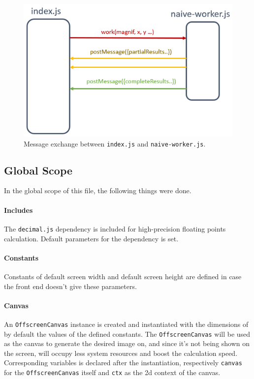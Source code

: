 \begin{figure}[th]
\centering
\includegraphics[width=\textwidth,keepaspectratio]{Figures/Chapter4/messageexchange.png}
\decoRule
\caption[Message Exchange]{Message exchange between \texttt{index.js} and \texttt{naive-worker.js}.}
\label{fig:messageexchange}
\end{figure}

\subsection{Global Scope}

In the global scope of this file, the following things were done.

\paragraph{Includes} The \texttt{decimal.js} dependency is included for high-precision floating points calculation. Default parameters for the dependency is set.

\paragraph{Constants} Constants of default screen width and default screen height are defined in case the front end doesn't give these parameters.

\paragraph{Canvas} An \texttt{OffscreenCanvas} instance is created and instantiated with the dimensions of by default the values of the defined constants. The \texttt{OffscreenCanvas} will be used as the canvas to generate the desired image on, and since it's not being shown on the screen, will occupy less system resources and boost the calculation speed. Corresponding variables is declared after the instantiation, respectively \texttt{canvas} for the \texttt{OffscreenCanvas} itself and \texttt{ctx} as the 2d context of the canvas.

